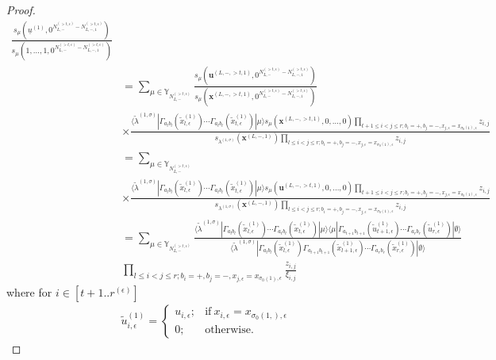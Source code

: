 \documentclass[10pt,a4paper]{amsart}
\newcommand\YY{\mathbb{Y}}
\newcommand\si{\sigma}
\begin{document}
\begin{proof}
\begin{align*}
\frac{s_{\mu}(\underline{u}^{(1)},0^{N_{L,-}^{(>t,\epsilon)}-N_{L,-,1}^{(>t,\epsilon)}})}{s_{\mu}(1,\ldots,1,0^{N_{L,-}^{(>t,\epsilon)}-N_{L,-,1}^{(>t,\epsilon)}})}\\
&=\sum_{\mu\in \YY_{N_{L,-}^{(>t,\epsilon)}}}
\frac{s_{\mu}(\mathbf{u}^{(L,-,>t,1)},0^{N_{L,-}^{(>t,\epsilon)}-N_{L,-,1}^{(>t,\epsilon)}})}{s_{\mu}(\mathbf{x}^{(L,-,>t,1)},0^{N_{L,-}^{(>t,\epsilon)}-N_{L,-,1}^{(>t,\epsilon)}})}
\\
&\times\frac{\langle\tilde{\lambda}^{(1,\sigma)}| \Gamma_{a_lb_l}(\tilde{x}_{l,\epsilon}^{(1)})\cdots \Gamma_{a_{t}b_{t}}(\tilde{x}_{t,\epsilon}^{(1)})|\mu \rangle
s_{\mu}\left(\mathbf{x}^{(L,-,>t,1)},0,\ldots,0\right)\prod_{t+1\leq i<j\leq r;b_i=+,b_j=-,x_{j,\epsilon}=x_{\sigma_0(1),\epsilon}}z_{i,j}}{s_{\lambda^{(1,\si)}}\left(\mathbf{x}^{(L,-,1)}\right)\prod_{l\leq i<j\leq r;b_i=+,b_j=-,x_{j,\epsilon}=x_{\sigma_0(1),\epsilon}}z_{i,j}}\\ 
&=\sum_{\mu\in \YY_{N_{L,-}^{(>t,\epsilon)}}}
\\
&\times\frac{\langle\tilde{\lambda}^{(1,\sigma)}| \Gamma_{a_lb_l}(\tilde{x}_{l,\epsilon}^{(1)})\cdots \Gamma_{a_{t}b_{t}}(\tilde{x}_{t,\epsilon}^{(1)})|\mu \rangle
s_{\mu}\left(\mathbf{u}^{(L,-,>t,1)},0,\ldots,0\right)\prod_{t+1\leq i<j\leq r;b_i=+,b_j=-,x_{j,\epsilon}=x_{\sigma_0(1),\epsilon}}z_{i,j}}{s_{\lambda^{(1,\si)}}\left(\mathbf{x}^{(L,-,1)}\right)\prod_{l\leq i<j\leq r;b_i=+,b_j=-,x_{j,\epsilon}=x_{\sigma_0(1),\epsilon}}z_{i,j}}\\
&=\sum_{\mu\in \YY_{N_{L,-}^{(>t,\epsilon)}}}\frac{\langle\tilde{\lambda}^{(1,\sigma)}| \Gamma_{a_lb_l}(\tilde{x}_{l,\epsilon}^{(1)})\cdots \Gamma_{a_{t}b_{t}}(\tilde{x}_{t,\epsilon}^{(1)})|\mu \rangle
\langle\mu| \Gamma_{a_{t+1}b_{t+1}}(\tilde{u}_{t+1,\epsilon}^{(1)})\cdots \Gamma_{a_{r}b_{r}}(\tilde{u}_{r,\epsilon}^{(1)})|\emptyset \rangle}{\langle\tilde{\lambda}^{(1,\sigma)}| \Gamma_{a_lb_l}(\tilde{x}_{l,\epsilon}^{(1)})\Gamma_{a_{l+1}b_{l+1}}(\tilde{x}_{l+1,\epsilon}^{(1)})\cdots \Gamma_{a_rb_r}(\tilde{x}_{r,\epsilon}^{(1)})|\emptyset \rangle}\\
&\prod_{l\leq i<j\leq r;b_i=+,b_j=-,x_{j,\epsilon}=x_{\sigma_0(1),\epsilon}}\frac{z_{i,j}}{\xi_{i,j}}
\end{align*}
where for $i\in[t+1..r^{(\epsilon)}]$
\begin{align*}
\tilde{u}_{i,\epsilon}^{(1)}=\begin{cases}u_{i,\epsilon};&\mathrm{if}\ x_{i,\epsilon}=x_{\si_0(1,),\epsilon}\\0;&\mathrm{otherwise}.\end{cases}
\end{align*}


\end{proof}
\end{document}
